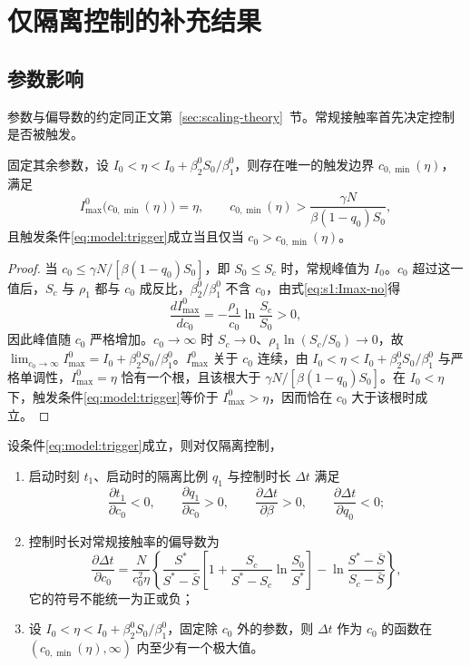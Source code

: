 \section{仅隔离控制的补充结果}
\label{sec:sup:single-control}

\subsection{参数影响}
\label{sec:sup:contact-theory}
参数与偏导数的约定同正文第~\ref{sec:scaling-theory}~节。常规接触率首先决定控制是否被触发。
\begin{lemma}
\label{lem:s1:trigger-boundary}
固定其余参数，设 $I_0<\eta<I_0+\beta_2^0S_0/\beta_1^0$，则存在唯一的触发边界 $c_{0,\min}(\eta)$，满足
\begin{equation}
I_{\max}^{0}\bigl(c_{0,\min}(\eta)\bigr)=\eta,
\qquad c_{0,\min}(\eta)>\frac{\gamma N}{\beta(1-q_0)S_0},
\label{eq:s1:c0-min-def}
\end{equation}
且触发条件\eqref{eq:model:trigger}成立当且仅当 $c_0>c_{0,\min}(\eta)$。
\end{lemma}
\begin{proof}
当 $c_0\le\gamma N/[\beta(1-q_0)S_0]$，即 $S_0\le S_c$ 时，常规峰值为 $I_0$。$c_0$ 超过这一值后，$S_c$ 与 $\rho_1$ 都与 $c_0$ 成反比，$\beta_2^0/\beta_1^0$ 不含 $c_0$，由式\eqref{eq:s1:Imax-no}得
\begin{equation}
\frac{dI_{\max}^{0}}{dc_0}
=-\frac{\rho_1}{c_0}\ln\frac{S_c}{S_0}>0,
\label{eq:s1:Imax-no-c0-derivative}
\end{equation}
因此峰值随 $c_0$ 严格增加。$c_0\to\infty$ 时 $S_c\to0$、$\rho_1\ln(S_c/S_0)\to0$，故 $\lim_{c_0\to\infty}I_{\max}^{0}=I_0+\beta_2^0S_0/\beta_1^0$。$I_{\max}^{0}$ 关于 $c_0$ 连续，由 $I_0<\eta<I_0+\beta_2^0S_0/\beta_1^0$ 与严格单调性，$I_{\max}^{0}=\eta$ 恰有一个根，且该根大于 $\gamma N/[\beta(1-q_0)S_0]$。在 $I_0<\eta$ 下，触发条件\eqref{eq:model:trigger}等价于 $I_{\max}^{0}>\eta$，因而恰在 $c_0$ 大于该根时成立。
\end{proof}
\begin{proposition}
\label{prop:contact-effects}\label{cor:s1:duration-sensitivity}
设条件\eqref{eq:model:trigger}成立，则对仅隔离控制，
\begin{enumerate}
\renewcommand{\labelenumi}{(\roman{enumi})}
\item 启动时刻 $t_1$、启动时的隔离比例 $q_1$ 与控制时长 $\Delta t$ 满足
\[
\frac{\partial t_1}{\partial c_0}<0,\qquad
\frac{\partial q_1}{\partial c_0}>0,\qquad
\frac{\partial\Delta t}{\partial\beta}>0,\qquad
\frac{\partial\Delta t}{\partial q_0}<0;
\]
\item 控制时长对常规接触率的偏导数为
\begin{equation}
\frac{\partial\Delta t}{\partial c_0}
=\frac{N}{c_0^2\eta}
\left\{\frac{S^*}{S^*-\bar S}
\left[1+\frac{S_c}{S^*-S_c}\ln\frac{S_0}{S^*}\right]
-\ln\frac{S^*-\bar S}{S_c-\bar S}\right\},
\label{eq:duration-c0}
\end{equation}
它的符号不能统一为正或负；
\item 设 $I_0<\eta<I_0+\beta_2^0S_0/\beta_1^0$，固定除 $c_0$ 外的参数，则 $\Delta t$ 作为 $c_0$ 的函数在 $(c_{0,\min}(\eta),\infty)$ 内至少有一个极大值。
\end{enumerate}
\end{proposition}
